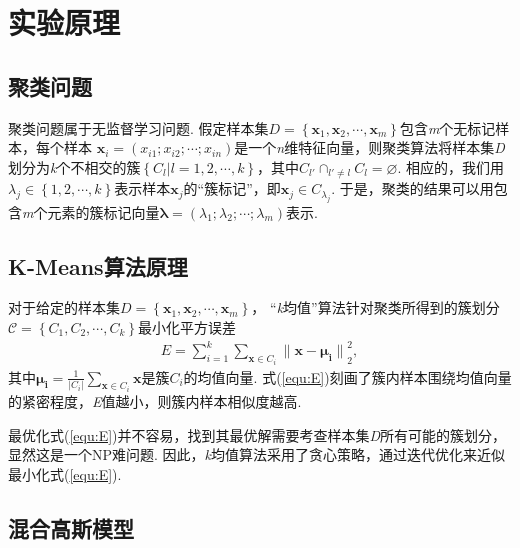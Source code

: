 \documentclass{hitreport}
\begin{document}
\section{实验原理}

\subsection{聚类问题}

聚类问题属于无监督学习问题. 假定样本集$D = \left\{\boldsymbol{x}_1, \boldsymbol{x}_2, \cdots, \boldsymbol{x}_m\right\}$包含\textit{m}个无标记样本，每个样本 $\boldsymbol{x}_i=\left(x_{i1} ; x_{i2} ; \cdots ; x_{in}\right)$是一个\textit{n}维特征向量，则聚类算法将样本集\textit{D}划分为\textit{k}个不相交的簇$\left\{C_l|l=1,2,\cdots, k\right\}$，其中$C_{l'}\cap_{l'\ne l}C_{l} = \varnothing$. 相应的，我们用$\lambda_j\in \left\{1,2, \cdots, k\right\}$表示样本$\boldsymbol{x}_j$的“簇标记”，即$\boldsymbol{x}_j\in C_{\lambda_j}$. 于是，聚类的结果可以用包含\textit{m}个元素的簇标记向量$\boldsymbol{\lambda} = \left(\lambda_1;\lambda_2;\cdots;\lambda_m\right)$表示.

\subsection{K-Means算法原理}

对于给定的样本集$D = \left\{\boldsymbol{x}_1, \boldsymbol{x}_2, \cdots, \boldsymbol{x}_m\right\}$， “\textit{k}均值”算法针对聚类所得到的簇划分$\mathcal{C} = \left\{C_1, C_2, \cdots, C_k\right\}$最小化平方误差
\begin{align}\label{equ:E}
E = \sum_{i=1}^{k}\sum_{\boldsymbol{x}\in C_i}{\lVert \boldsymbol{x} -\boldsymbol{\mu_i} \rVert}_{2}^{2},
\end{align}
其中$\boldsymbol{\mu_i} = \frac{1}{\lvert C_i \rvert}\sum_{\boldsymbol{x} \in C_i} \boldsymbol{x}$是簇$C_i$的均值向量. 式(\ref{equ:E})刻画了簇内样本围绕均值向量的紧密程度，\textit{E}值越小，则簇内样本相似度越高. 

最优化式(\ref{equ:E})并不容易，找到其最优解需要考查样本集\textit{D}所有可能的簇划分，显然这是一个NP难问题. 因此，\textit{k}均值算法采用了贪心策略，通过迭代优化来近似最小化式(\ref{equ:E}). 



\subsection{混合高斯模型}
\end{document}
